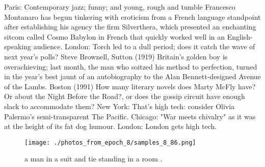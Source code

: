 \documentclass{article}%
\begin{document}
Paris: Contemporary jazz; funny; and young, rough and tumble\newline%
Francesco Montanaro has begun tinkering with eroticism from a French language standpoint after establishing his agency the firm Silverthera, which presented an enchanting sitcom called Cosmo Babylon in French that quickly worked well in an English{-}speaking audience.\newline%
London: Torch led to a dull period; does it catch the wave of next year's polls?\newline%
Steve Brownell, Sutton (1919)\newline%
Britain's golden boy is overachieving; last month, the man who soitzed his method to perfection, turned in the year's best jaunt of an autobiography to the Alan Bennett{-}designed Avenue of the Lambs.\newline%
Boston (1991)\newline%
How many literary novels does Marty McFly have? Or about the Night Before the Road?, or does the gossip circuit have enough slack to accommodate them?\newline%
New York: That's high tech: consider Olivia Palermo's semi{-}transparent The Pacific.\newline%
Chicago: "War meets chivalry" as it was at the height of its fat dog humour.\newline%
London: London gets high tech.\newline%

%


\begin{figure}[h!]%
\centering%
\texttt{[image: ./photos\_from\_epoch\_8/samples\_8\_86.png]}%
\caption{a man in a suit and tie standing in a room .}%
\end{figure}

%
\end{document}
